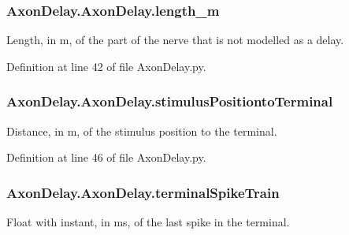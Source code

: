\subsubsection[{\texorpdfstring{length\+\_\+m}{length_m}}]{\setlength{\rightskip}{0pt plus 5cm}Axon\+Delay.\+Axon\+Delay.\+length\+\_\+m}\hypertarget{class_axon_delay_1_1_axon_delay_a08ab7285929002db2108179ea9f5d5dd}{}\label{class_axon_delay_1_1_axon_delay_a08ab7285929002db2108179ea9f5d5dd}


Length, in m, of the part of the nerve that is not modelled as a delay. 



Definition at line 42 of file Axon\+Delay.\+py.

\subsubsection[{\texorpdfstring{stimulus\+Positionto\+Terminal}{stimulusPositiontoTerminal}}]{\setlength{\rightskip}{0pt plus 5cm}Axon\+Delay.\+Axon\+Delay.\+stimulus\+Positionto\+Terminal}\hypertarget{class_axon_delay_1_1_axon_delay_a3f6bb8f38c4474806544d01fbe9c0361}{}\label{class_axon_delay_1_1_axon_delay_a3f6bb8f38c4474806544d01fbe9c0361}


Distance, in m, of the stimulus position to the terminal. 



Definition at line 46 of file Axon\+Delay.\+py.

\subsubsection[{\texorpdfstring{terminal\+Spike\+Train}{terminalSpikeTrain}}]{\setlength{\rightskip}{0pt plus 5cm}Axon\+Delay.\+Axon\+Delay.\+terminal\+Spike\+Train}\hypertarget{class_axon_delay_1_1_axon_delay_aba392d8938766355063cf4bf3a87962d}{}\label{class_axon_delay_1_1_axon_delay_aba392d8938766355063cf4bf3a87962d}


Float with instant, in ms, of the last spike in the terminal. 



